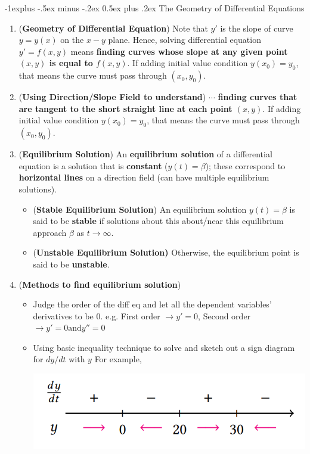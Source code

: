 \documentclass[10pt, landscape]{article}
\makeatletter
\renewcommand{\subsection}{\@startsection{subsection}{2}{0mm}%
                                {-1explus -.5ex minus -.2ex}%
                                {0.5ex plus .2ex}%
                                {\normalfont\normalsize\bfseries}}
\makeatother
\begin{document}
\begin{multicols}{4}
\subsection{The Geometry of Differential Equations}
\begin{enumerate}
    \item (\textbf{Geometry of Differential Equation}) Note that $y'$ is the slope of curve $y=y(x)$ on the $x-y$ plane. Hence, solving differential equation $y'=f(x,y)$ means \textbf{finding curves whose slope at any given point $(x,y)$ is equal to $f(x,y)$}. If adding initial value condition $y(x_0)=y_0$, that means the curve must pass through $(x_0, y_0)$.
    \item (\textbf{Using Direction/Slope Field to understand}) $\cdots$ \textbf{finding curves that are tangent to the short straight line at each point $(x,y)$}. If adding initial value condition $y(x_0)=y_0$, that means the curve must pass through $(x_0, y_0)$.
    \item (\textbf{Equilibrium Solution}) An \textbf{equilibrium solution} of a differential equation is a solution that is \textbf{constant} ($y(t)=\beta$); these correspond to \textbf{horizontal lines} on a direction field (can have multiple equilibrium solutions).
    \begin{itemize}
        \item (\textbf{Stable Equilibrium Solution}) An equilibrium solution $y(t)=\beta$ is said to be \textbf{stable} if solutions about this about/near this equilibrium approach $\beta$ as $t\to \infty$.
        \item (\textbf{Unstable Equilibrium Solution)} Otherwise, the equilibrium point is said to be \textbf{unstable}.
    \end{itemize}
    \item (\textbf{Methods to find equilibrium solution})
    \begin{itemize}
        \item Judge the order of the diff eq and let all the dependent variables' derivatives to be 0. e.g. First order $\rightarrow y'=0$, Second order $\rightarrow y'=0 \text{and} y''=0$ 
        \item Using basic inequality technique to solve and sketch out a sign diagram for $dy/dt$ with $y$ For example,\\
        \centerline{\includegraphics[width=0.9\linewidth]{image/sign-diagram-for-dydt.png}}

\end{itemize}
\end{enumerate}
\end{multicols}
\end{document}
